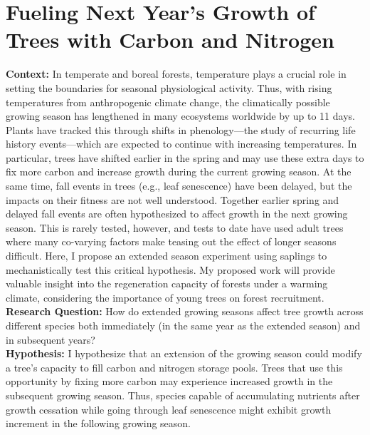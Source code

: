 \documentclass[12pt]{article}
\begin{document}
\section*{Fueling Next Year's Growth of Trees with Carbon and Nitrogen}
\textbf {Context:} %
In temperate and boreal forests, temperature plays a crucial role in setting the boundaries for seasonal physiological activity. Thus, with rising temperatures from anthropogenic climate change, the climatically possible growing season has lengthened in many ecosystems worldwide by up to 11 days.\citep{korner_phenology_2010, menzel_growing_1999} Plants have tracked this through shifts in phenology—the study of recurring life history events—which are expected to continue with increasing temperatures.\citep{wolkovich_warming_2012} In particular, trees have shifted earlier in the spring and may use these extra days to fix more carbon and increase growth during the current growing season.\citep{keenan_net_2014, wang_interactive_2020} At the same time, fall events in trees (e.g., leaf senescence) have been delayed, but the impacts on their fitness are not well understood. Together earlier spring and delayed fall events are often hypothesized to affect growth in the next growing season. This is rarely tested, however, and tests to date have used adult trees where many co-varying factors make teasing out the effect of longer seasons difficult. Here, I propose an extended season experiment using saplings to mechanistically test this critical hypothesis. My proposed work will provide valuable insight into the regeneration capacity of forests under a warming climate, considering the importance of young trees on forest recruitment.\citep{zohner_how_2021} \\
\textbf {Research Question:} How do extended growing seasons affect tree growth across different species both immediately (in the same year as the extended season) and in subsequent years? \\
\textbf {Hypothesis:} I hypothesize that an extension of the growing season could modify a tree’s capacity to fill carbon and nitrogen storage pools.\citep{chapin_ecology_1990, lawrence_variable_2018} Trees that use this opportunity by fixing more carbon may experience increased growth in the subsequent growing season.\citep{landhausser_partitioning_2012, martens_first-year_2007} Thus, species capable of accumulating nutrients after growth cessation while going through leaf senescence might exhibit growth increment in the following growing season.\citep{schott_premature_2013} \\
\end{document}

